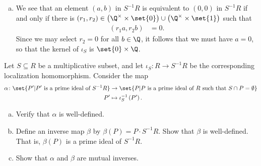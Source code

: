 \documentclass[10pt]{mypackage}
\renewcommand*{\mathbb}[1]{\varmathbb{#1}}
\begin{document}
\begin{solution}
\begin{enumerate}[(a)]
\begin{center}
      \end{center}
    \item We see that an element $\left( a,b \right)$ in $S^{-1}R$ is equivalent to $\left( 0,0 \right)$ in $S^{-1}R$ if and only if there is $ \left( r_1,r_2 \right)\in \left( \Q^{\times}\times \set{0}  \right) \cup \left( \Q^{\times}\times \set{1} \right) $ such that
      \begin{align*}
        \left( r_1a,r_2b \right) &= 0.
      \end{align*}
      Since we may select $r_2 = 0$ for all $b\in \Q$, it follows that we must have $a = 0$, so that the kernel of $\iota_S$ is $ \set{0}\times \Q $.
  \end{enumerate}
\end{solution}
\begin{problem}[Problem 7]
  Let $S\subseteq R$ be a multiplicative subset, and let $\iota_S\colon R\rightarrow S^{-1}R$ be the corresponding localization homomorphism. Consider the map
  \begin{align*}
    \alpha\colon \set{P'| P'\text{ is a prime ideal of }S^{-1}R}&\rightarrow \set{P | P\text{ is a prime ideal of }R\text{ such that }S\cap P = \emptyset}\\
    P'&\mapsto \iota_S^{-1}\left( P' \right).
  \end{align*}
  \begin{enumerate}[(a)]
    \item Verify that $\alpha$ is well-defined.
    \item Define an inverse map $\beta$ by $\beta(P) = P\cdot S^{-1}R$. Show that $\beta$ is well-defined. That is, $\beta(P)$ is a prime ideal of $S^{-1}R$.
    \item Show that $\alpha$ and $\beta$ are mutual inverses.
  \end{enumerate}
\end{problem}
\end{document}
